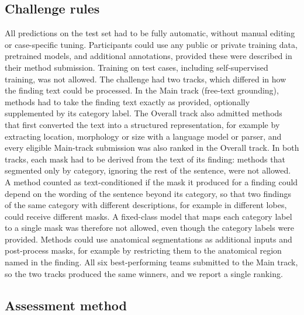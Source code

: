\documentclass[final,5p,times,twocolumn,authoryear,numafflabel]{elsarticle}
\begin{document}
\subsection{Challenge rules}
\label{sec:organization}

All predictions on the test set had to be fully automatic, without manual
editing or case-specific tuning. Participants could use any public or private
training data, pretrained models, and additional annotations, provided these
were described in their method submission. Training on test cases, including
self-supervised training, was not allowed. The challenge had two tracks, which differed in how the finding text could
be processed. In the Main track (free-text grounding), methods had to take the
finding text exactly as provided, optionally supplemented by its category label.
The Overall track also admitted methods that first converted the text into a
structured representation, for example by extracting location, morphology or
size with a language model or parser, and every eligible Main-track submission
was also ranked in the Overall track. In both tracks, each mask had to be
derived from the text of its finding: methods that segmented only by category,
ignoring the rest of the sentence, were not allowed. A method counted as text-conditioned if the mask it produced for a finding
could depend on the wording of the sentence beyond its category, so that two
findings of the same category with different descriptions, for example in
different lobes, could receive different masks. A fixed-class model that maps
each category label to a single mask was therefore not allowed, even though
the category labels were provided. Methods could use anatomical segmentations as
additional inputs and post-process masks, for example by restricting them to the
anatomical region named in the finding. All six best-performing
teams submitted to the Main track, so the two tracks produced the same winners,
and we report a single ranking.


\subsection{Assessment method}
\label{sec:assessment}
\end{document}
